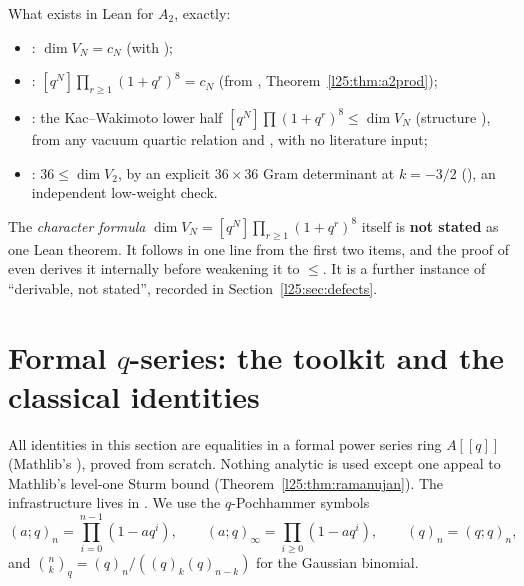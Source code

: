 \begin{remark}\label{l25:rem:a2cons}
What exists in Lean for $A_2$, exactly:
\begin{itemize}
\item {}: $\dim V_N=c_N$ (with );
\item {}: $[q^N]\prod_{r\ge1}(1+q^r)^8=c_N$ (from ,
  Theorem~\ref{l25:thm:a2prod});
\item {}: the Kac--Wakimoto lower half $[q^N]\prod(1+q^r)^8\le\dim V_N$
  (structure ), from any vacuum quartic relation and , with no
  literature input;
\item {}: $36\le\dim V_2$, by an explicit $36\times36$ Gram determinant at $k=-3/2$
  (), an independent low-weight check.
\end{itemize}
The \emph{character formula} $\dim V_N=[q^N]\prod_{r\ge1}(1+q^r)^8$ itself is \textbf{not stated} as one Lean theorem.
It follows in one line from the first two items, and the proof of  even
derives it internally before weakening it to $\le$. It is a further instance of ``derivable, not stated'', recorded in
Section~\ref{l25:sec:defects}.
\end{remark}

\section{Formal \texorpdfstring{$q$}{q}-series: the toolkit and the classical identities}\label{l25:sec:qseries}

All identities in this section are equalities in a formal power series ring $A[[q]]$ (Mathlib's
), proved from scratch. Nothing analytic is used except one appeal to Mathlib's level-one
Sturm bound (Theorem~\ref{l25:thm:ramanujan}). The infrastructure lives in
. We use the $q$-Pochhammer symbols
\begin{equation*}
(a;q)_n=\prod_{i=0}^{n-1}(1-aq^i),\qquad (a;q)_\infty=\prod_{i\ge0}(1-aq^i),\qquad (q)_n=(q;q)_n,
\end{equation*}
and $\binom nk_q=(q)_n/((q)_k(q)_{n-k})$ for the Gaussian binomial.

